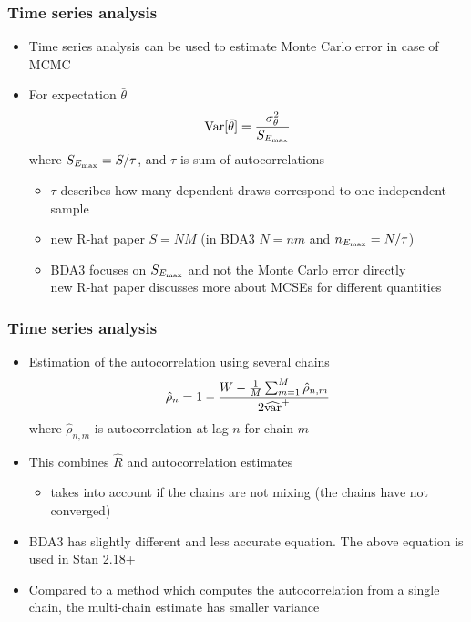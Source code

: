 \documentclass[10pt,handout]{beamer}
\begin{document}
\begin{frame}

\frametitle{ Time series analysis}

  \begin{itemize}
  \item Time series analysis can be used to estimate Monte Carlo
    error in case of MCMC
  \item For expectation $\bar{\theta}$
    \begin{equation*}
      \mathrm{Var}[\bar{\theta}] = \frac{\sigma^2_\theta}{S_{E_{\rm max}}}
    \end{equation*}
    where $S_{E_{\rm max}}=S/\tau$, and $\tau$ is sum of autocorrelations
    \begin{itemize}
      \item<2-> $\tau$ describes how many dependent draws correspond to one independent sample
      \item<3-> new R-hat paper $S=NM$ (in BDA3 $N=nm$ and $n_{E_{\rm max}}=N/\tau$)
      \item<4-> BDA3 focuses on $S_{E_{\rm max}}$ and not the Monte Carlo error directly\\
        new R-hat paper discusses more about MCSEs for different quantities
    \end{itemize}
  \end{itemize}
\end{frame}

\begin{frame}

\frametitle{ Time series analysis}

  \begin{itemize}
  \item Estimation of the autocorrelation using several chains
    \begin{equation*}
      \hat{\rho}_n=1-\frac{W - \frac{1}{M}\sum_{m=1}^M \hat{\rho}_{n,m}}{2\widehat{\mathrm{var}}^{+}}
    \end{equation*}
    where $\hat{\rho}_{n,m}$ is autocorrelation at lag $n$ for chain $m$
  \item<2-> This combines $\widehat{R}$ and autocorrelation estimates
    \begin{itemize}
    \item takes into account if the chains are not mixing (the chains have not converged)
    \end{itemize}
  \item<3-> BDA3 has slightly different and less accurate equation. The
    above equation is used in Stan 2.18+
  \item<4-> Compared to a method which computes the autocorrelation
    from a single chain, the multi-chain estimate has smaller variance
 \end{itemize}
\end{frame}
\end{document}
